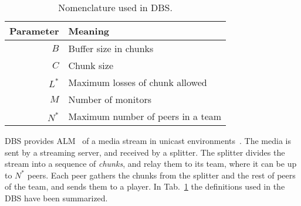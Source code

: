 
\label{sec:DBS}

\begin{table}
  \begin{tabular}{rl}
    Parameter & Meaning \\
    \hline
    $B$    & Buffer size in chunks \\
    $C$    & Chunk size \\
    $L^*$  & Maximum losses of chunk allowed \\
    $M$    & Number of monitors \\
    $N^*$  & Maximum number of peers in a team
  \end{tabular}
  \caption{Nomenclature used in DBS.\label{tab:DBS_nomenclature}}
\end{table}

DBS provides ALM~\cite{banerjee2002scalable} of a media stream in
unicast environments~\cite{comer2003computer}. The media is sent by a
streaming server, and received by a splitter. The splitter divides the stream into a
sequence of \emph{chunks}, and relay them to its team, where it can be
up to $N^*$ peers. Each peer gathers the chunks from the splitter and
the rest of peers of the team, and sends them to a player. In
Tab.~\ref{tab:DBS_nomenclature} the definitions used in
the DBS have been summarized.
\begin{comment}
In single layered streams\footnote{Each layer of a
  scalable stream is received by a different peer attached to the same
  player capable or render scalable media.}, each peer is spawned by a
player (normal users should not run peers directly).
\end{comment}

\begin{comment}
/* quitar: We define the set of teams as
$\{T\}$,
and enumerate the peers in the team $T$ as $T=\{P_1,\cdots,P_{|T|}\}$. */
\end{comment}
